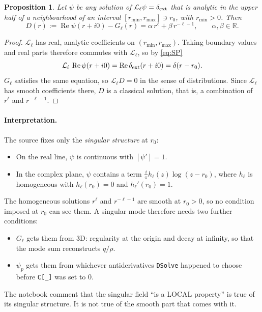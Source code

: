 \documentclass[11pt,a4paper]{article}
\renewcommand{\Re}{\operatorname{Re}}
\newcommand{\dext}{\delta_{\rm ext}}
\newcommand{\Lop}{\mathcal{L}_\ell}
\newcommand{\code}[1]{\texttt{#1}}
\newtheorem{proposition}{Proposition}
\begin{document}
\begin{proposition}\label{prop:homog}
Let $\psi$ be any solution of $\Lop\psi=\dext$ that is analytic in the upper half of a neighbourhood of an interval $[r_{\min},r_{\max}]\ni r_0$, with $r_{\min}>0$.
Then
\begin{equation}
D(r):=\Re\psi(r+i0)-G_\ell(r)=\alpha\,r^\ell+\beta\,r^{-\ell-1},\qquad \alpha,\beta\in\mathbb R .
\end{equation}
\end{proposition}
\begin{proof}
$\Lop$ has real, analytic coefficients on $(r_{\min},r_{\max})$.
Taking boundary values and real parts therefore commutes with $\Lop$, so by \eqref{eq:SP}
\[
\Lop\,\Re\psi(r+i0)=\Re\dext(r+i0)=\delta(r-r_0).
\]
$G_\ell$ satisfies the same equation, so $\Lop D=0$ in the sense of distributions.
Since $\Lop$ has smooth coefficients there, $D$ is a classical solution, that is, a combination of $r^\ell$ and $r^{-\ell-1}$.
\end{proof}

\paragraph{Interpretation.}
The source fixes only the \emph{singular structure} at $r_0$:
\begin{itemize}[nosep]
\item On the real line, $\psi$ is continuous with $[\psi']=1$.
\item In the complex plane, $\psi$ contains a term $\frac{i}{\pi}h_\ell(z)\log(z-r_0)$, where $h_\ell$ is homogeneous with $h_\ell(r_0)=0$ and $h_\ell'(r_0)=1$.
\end{itemize}
The homogeneous solutions $r^\ell$ and $r^{-\ell-1}$ are smooth at $r_0>0$, so no condition imposed at $r_0$ can see them.
A singular mode therefore needs two further conditions:
\begin{itemize}[nosep]
\item $G_\ell$ gets them from 3D: regularity at the origin and decay at infinity, so that the mode sum reconstructs $q/\rho$.
\item $\psi_p$ gets them from whichever antiderivatives \code{DSolve} happened to choose before \code{C[\_]} was set to $0$.
\end{itemize}
The notebook comment that the singular field ``is a LOCAL property'' is true of its singular structure.
It is not true of the smooth part that comes with it.
\end{document}
